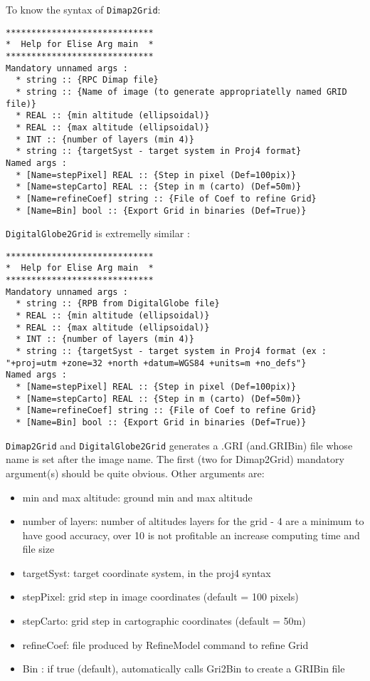 To know the syntax of {\tt Dimap2Grid}:
\begin{verbatim}
*****************************
*  Help for Elise Arg main  *
*****************************
Mandatory unnamed args :
  * string :: {RPC Dimap file}
  * string :: {Name of image (to generate appropriatelly named GRID file)}
  * REAL :: {min altitude (ellipsoidal)}
  * REAL :: {max altitude (ellipsoidal)}
  * INT :: {number of layers (min 4)}
  * string :: {targetSyst - target system in Proj4 format}
Named args :
  * [Name=stepPixel] REAL :: {Step in pixel (Def=100pix)}
  * [Name=stepCarto] REAL :: {Step in m (carto) (Def=50m)}
  * [Name=refineCoef] string :: {File of Coef to refine Grid}
  * [Name=Bin] bool :: {Export Grid in binaries (Def=True)}

\end{verbatim}


{\tt DigitalGlobe2Grid} is extremelly similar :
\begin{verbatim}
*****************************
*  Help for Elise Arg main  *
*****************************
Mandatory unnamed args :
  * string :: {RPB from DigitalGlobe file}
  * REAL :: {min altitude (ellipsoidal)}
  * REAL :: {max altitude (ellipsoidal)}
  * INT :: {number of layers (min 4)}
  * string :: {targetSyst - target system in Proj4 format (ex : "+proj=utm +zone=32 +north +datum=WGS84 +units=m +no_defs"}
Named args :
  * [Name=stepPixel] REAL :: {Step in pixel (Def=100pix)}
  * [Name=stepCarto] REAL :: {Step in m (carto) (Def=50m)}
  * [Name=refineCoef] string :: {File of Coef to refine Grid}
  * [Name=Bin] bool :: {Export Grid in binaries (Def=True)}
 \end{verbatim}
 
{\tt Dimap2Grid} and {\tt DigitalGlobe2Grid} generates a .GRI (and.GRIBin) file whose name is set after the image name.
The first (two for Dimap2Grid) mandatory argument(s) should be quite obvious. Other arguments are:
\begin{itemize}
\item min and max altitude: ground min and max altitude
\item number of layers: number of altitudes layers for the grid - 4 are a minimum to have good accuracy, over 10 is not profitable an increase computing time and file size
\item targetSyst: target coordinate system, in the proj4 syntax
\item stepPixel: grid step in image coordinates (default = 100 pixels)
\item stepCarto: grid step in cartographic coordinates (default = 50m)
\item refineCoef: file produced by RefineModel command to refine Grid
\item Bin : if true (default), automatically calls Gri2Bin to create a GRIBin file
\end{itemize}


